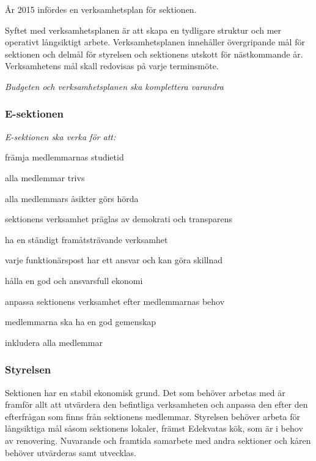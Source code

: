 \documentclass[../_main/handlingar.tex]{subfiles}
\begin{document}

År 2015 infördes en verksamhetsplan för sektionen.

Syftet med verksamhetsplanen är att skapa en tydligare struktur och mer operativt långsiktigt arbete. Verksamhetsplanen innehåller övergripande mål för sektionen och delmål för styrelsen och sektionens utskott för nästkommande år. Verksamhetens mål skall redovisas på varje terminsmöte.

\emph{Budgeten och verksamhetsplanen ska komplettera varandra}

\subsubsection*{E-sektionen}
\emph{E-sektionen ska verka för att:}
\begin{dashlist}
    \item främja medlemmarnas studietid
    \item alla medlemmar trivs
    \item alla medlemmars åsikter görs hörda
    \item sektionens verksamhet präglas av demokrati och transparens
    \item ha en ständigt framåtsträvande verksamhet
    \item varje funktionärspost har ett ansvar och kan göra skillnad
    \item hålla en god och ansvarsfull ekonomi
    \item anpassa sektionens verksamhet efter medlemmarnas behov
    \item medlemmarna ska ha en god gemenskap
    \item inkludera alla medlemmar
\end{dashlist}

\subsubsection*{Styrelsen}
Sektionen har en stabil ekonomisk grund. Det som behöver arbetas med är framför allt att utvärdera den befintliga verksamheten och anpassa den efter den efterfrågan som finns från sektionens medlemmar. Styrelsen behöver arbeta för långsiktiga mål såsom sektionens lokaler, främst Edekvatas kök, som är i behov av renovering. Nuvarande och framtida samarbete med andra sektioner och kåren behöver utvärderas samt utvecklas.
\end{document}
